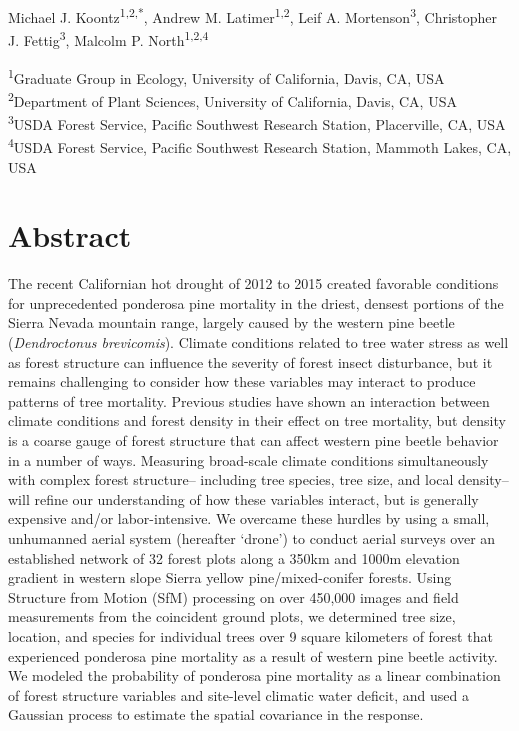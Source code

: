 \documentclass[twoside,12pt,final]{ucthesis-CA2012}
\begin{document}
\begin{ucmainmatter}
 Michael J.
Koontz\textsuperscript{1,2,*}, Andrew M. Latimer\textsuperscript{1,2},
Leif A. Mortenson\textsuperscript{3}, Christopher J.
Fettig\textsuperscript{3}, Malcolm P. North\textsuperscript{1,2,4}

\textsuperscript{1}Graduate Group in Ecology, University of California,
Davis, CA, USA\\
\textsuperscript{2}Department of Plant Sciences, University of
California, Davis, CA, USA\\
\textsuperscript{3}USDA Forest Service, Pacific Southwest Research
Station, Placerville, CA, USA\\
\textsuperscript{4}USDA Forest Service, Pacific Southwest Research
Station, Mammoth Lakes, CA, USA

\section{Abstract}\label{abstract-1}

The recent Californian hot drought of 2012 to 2015 created favorable
conditions for unprecedented ponderosa pine mortality in the driest,
densest portions of the Sierra Nevada mountain range, largely caused by
the western pine beetle (\emph{Dendroctonus brevicomis}). Climate
conditions related to tree water stress as well as forest structure can
influence the severity of forest insect disturbance, but it remains
challenging to consider how these variables may interact to produce
patterns of tree mortality. Previous studies have shown an interaction
between climate conditions and forest density in their effect on tree
mortality, but density is a coarse gauge of forest structure that can
affect western pine beetle behavior in a number of ways. Measuring
broad-scale climate conditions simultaneously with complex forest
structure-- including tree species, tree size, and local density-- will
refine our understanding of how these variables interact, but is
generally expensive and/or labor-intensive. We overcame these hurdles by
using a small, unhumanned aerial system (hereafter `drone') to conduct
aerial surveys over an established network of 32 forest plots along a
350km and 1000m elevation gradient in western slope Sierra yellow
pine/mixed-conifer forests. Using Structure from Motion (SfM) processing
on over 450,000 images and field measurements from the coincident ground
plots, we determined tree size, location, and species for individual
trees over 9 square kilometers of forest that experienced ponderosa pine
mortality as a result of western pine beetle activity. We modeled the
probability of ponderosa pine mortality as a linear combination of
forest structure variables and site-level climatic water deficit, and
used a Gaussian process to estimate the spatial covariance in the
response.


\end{ucmainmatter}
\end{document}
